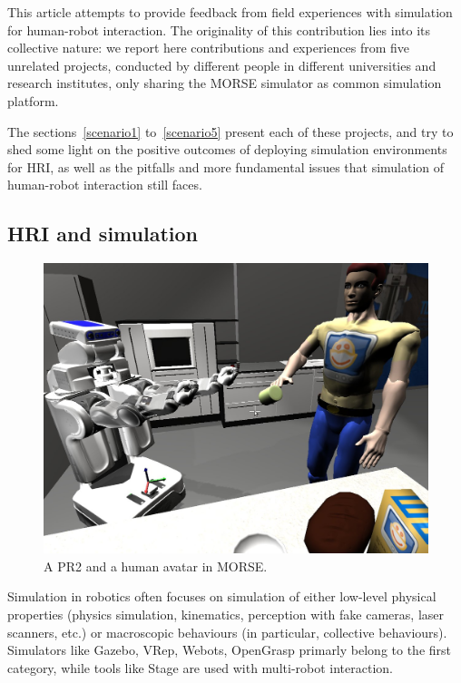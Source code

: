 \documentclass[conference]{IEEEtran}
\begin{document}



This article attempts to provide feedback from field experiences with simulation
for human-robot interaction. The originality of this contribution lies into its
collective nature: we report here contributions and experiences from five
unrelated projects, conducted by different people in different universities and
research institutes, only sharing the MORSE simulator as common simulation
platform.

The sections~\ref{scenario1} to~\ref{scenario5} present each of these projects,
and try to shed some light on the positive outcomes of deploying simulation
environments for HRI, as well as the pitfalls and more fundamental issues that
simulation of human-robot interaction still faces.

\subsection*{HRI and simulation}

\begin{figure}[ht!]
      \centering
      \includegraphics[width=0.9\linewidth]{morse_pr2.jpg}
      \caption{A PR2 and a human avatar in MORSE.}
      \label{fig|morse-hri}
\end{figure}



Simulation in robotics often focuses on simulation of either low-level physical
properties (physics simulation, kinematics, perception with fake cameras, laser
scanners, etc.) or macroscopic behaviours (in particular, collective
behaviours). Simulators like Gazebo, VRep, Webots, OpenGrasp 
primarly belong to the first category, while tools like Stage  are used with multi-robot interaction.
\end{document}
